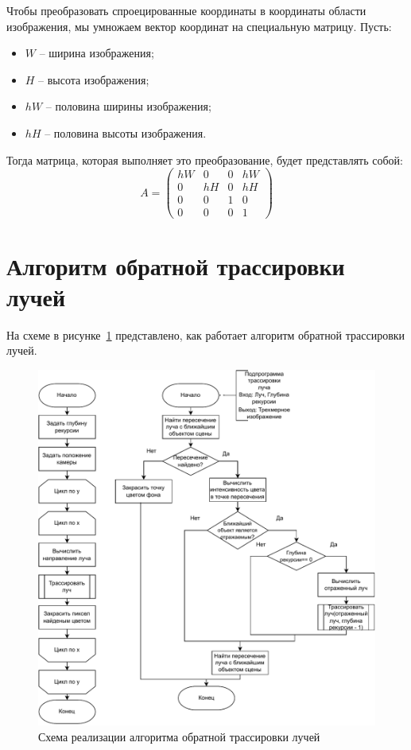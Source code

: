 Чтобы преобразовать спроецированные координаты в координаты области изображения, мы умножаем вектор координат на специальную матрицу.
Пусть:
\begin{itemize}
	\item $W$ -- ширина изображения;
	\item $H$ -- высота изображения;
	\item $hW$ -- половина ширины изображения;
	\item $hH$ -- половина высоты изображения.
\end{itemize}

Тогда матрица, которая выполняет это преобразование, будет представлять собой:
\begin{equation}
	A = \left(
	\begin{array}{cccc}
		hW & 0 & 0 & hW\\
		0 & hH & 0 & hH \\
		0 & 0 & 1 & 0 \\
		0 & 0 & 0 & 1
	\end{array}
	\right)
\end{equation}

\section{Алгоритм обратной трассировки лучей}

На схеме в рисунке~\ref{fig:raytrace} представлено, как работает алгоритм обратной трассировки лучей.
\FloatBarrier
\begin{figure}[h]
	\begin{center}
		\includegraphics[width=\linewidth]{photos/ray_tracing.pdf}
	\end{center}
	\caption{Схема реализации алгоритма обратной трассировки лучей}
	\label{fig:raytrace}
\end{figure}
\FloatBarrier

